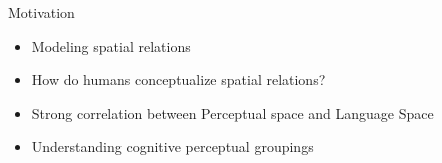 

\begin{frame}{Motivation}
	\begin{itemize}
		\item Modeling spatial relations
		
		\item How do humans conceptualize spatial relations?
		
		\item Strong correlation between Perceptual space and Language Space
		
		\item Understanding cognitive perceptual groupings

	\end{itemize}
\end{frame}
